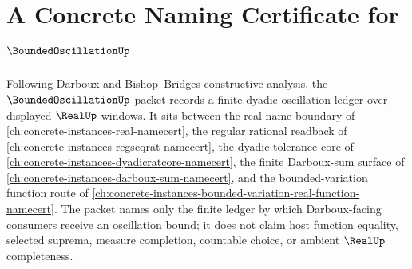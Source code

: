 \chapter{A Concrete Naming Certificate for $\BoundedOscillationUp$}
\label{ch:concrete-instances-bounded-oscillation-namecert}

Following Darboux and Bishop--Bridges constructive analysis, the $\BoundedOscillationUp$ packet records a finite dyadic oscillation ledger over displayed $\RealUp$ windows. It sits between the real-name boundary of \autoref{ch:concrete-instances-real-namecert}, the regular rational readback of \autoref{ch:concrete-instances-regseqrat-namecert}, the dyadic tolerance core of \autoref{ch:concrete-instances-dyadicratcore-namecert}, the finite Darboux-sum surface of \autoref{ch:concrete-instances-darboux-sum-namecert}, and the bounded-variation function route of \autoref{ch:concrete-instances-bounded-variation-real-function-namecert}. The packet names only the finite ledger by which Darboux-facing consumers receive an oscillation bound; it does not claim host function equality, selected suprema, measure completion, countable choice, or ambient $\RealUp$ completeness.

